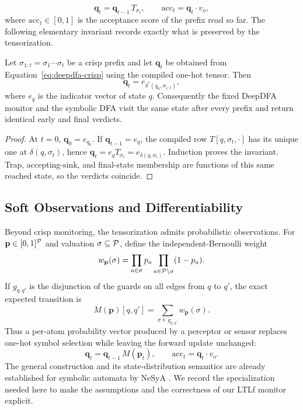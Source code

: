 \begin{equation}
  \mathbf{q}_t = \mathbf{q}_{t-1}\, T_{\sigma_t},
  \qquad
  \mathrm{acc}_t = \mathbf{q}_t \cdot v_o,
  \label{eq:deepdfa-crisp}
\end{equation}
where $\mathrm{acc}_t \in [0,1]$ is the acceptance score of the prefix read so far. The following elementary invariant records exactly what is preserved by the tensorization.

\begin{proposition}
\label{prop:deepdfa-crisp-equivalence}
Let $\sigma_{1:t}=\sigma_1\cdots\sigma_t$ be a crisp prefix and let $\mathbf q_t$ be obtained from Equation~\eqref{eq:deepdfa-crisp} using the compiled one-hot tensor. Then
\[
  \mathbf q_t=e_{\delta^*(q_0,\sigma_{1:t})},
\]
where $e_q$ is the indicator vector of state $q$. Consequently the fixed DeepDFA monitor and the symbolic DFA visit the same state after every prefix and return identical early and final verdicts.
\end{proposition}

\begin{proof}
At $t=0$, $\mathbf q_0=e_{q_0}$. If $\mathbf q_{t-1}=e_q$, the compiled row $T[q,\sigma_t,\cdot]$ has its unique one at $\delta(q,\sigma_t)$, hence $\mathbf q_t=e_qT_{\sigma_t}=e_{\delta(q,\sigma_t)}$. Induction proves the invariant. Trap, accepting-sink, and final-state membership are functions of this same reached state, so the verdicts coincide.
\end{proof}

\subsection{Soft Observations and Differentiability}
\label{sec:deepdfa-soft}

Beyond crisp monitoring, the tensorization admits probabilistic observations. For $\mathbf p\in[0,1]^{{\mathcal{P}}}$ and valuation $\sigma\subseteq{\ensuremath{\mathcal{P}}}$, define the independent-Bernoulli weight
\begin{equation}
  w_{\mathbf p}(\sigma)
  =\prod_{a\in\sigma}p_a\prod_{a\in{\ensuremath{\mathcal{P}}}\setminus\sigma}(1-p_a).
  \label{eq:valuation-weight}
\end{equation}
If $g_{q,q'}$ is the disjunction of the guards on all edges from $q$ to $q'$, the exact expected transition is
\begin{equation}
  M(\mathbf p)[q,q']
  =\sum_{\sigma\models g_{q,q'}}w_{\mathbf p}(\sigma).
  \label{eq:expected-transition-wmc}
\end{equation}
Thus a per-atom probability vector produced by a perceptor or sensor replaces one-hot symbol selection while leaving the forward update unchanged:
\begin{equation}
  \mathbf{q}_t = \mathbf{q}_{t-1}\, M(\mathbf{p}_t),
  \qquad
  \mathrm{acc}_t = \mathbf{q}_t \cdot v_o.
  \label{eq:deepdfa-soft}
\end{equation}
The general construction and its state-distribution semantics are already established for symbolic automata by NeSyA \cite{NesyA}. We record the specialization needed here to make the assumptions and the correctness of our LTLf monitor explicit.

